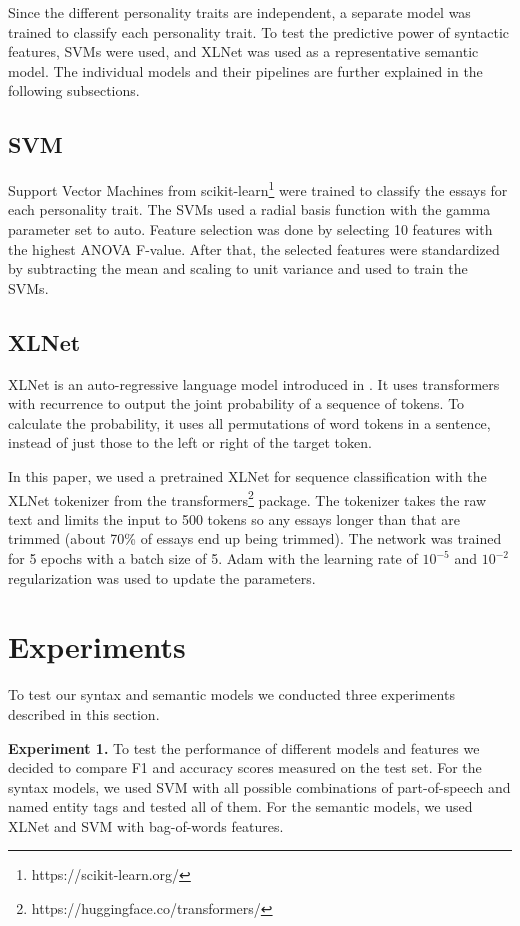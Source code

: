 \documentclass[10pt, a4paper]{article}
\begin{document}
Since the different personality traits are independent, a separate model was trained to classify each personality trait.
To test the predictive power of syntactic features, SVMs were used, and XLNet was used as a representative semantic model.
The individual models and their pipelines are further explained in the following subsections.

\subsection{SVM}

Support Vector Machines from scikit-learn\footnote{https://scikit-learn.org/} were trained to classify the essays for each personality trait.
The SVMs used a radial basis function with the gamma parameter set to auto.
Feature selection was done by selecting 10 features with the highest ANOVA F-value.
After that, the selected features were standardized by subtracting the mean and scaling to unit variance and used to train the SVMs.

\subsection{XLNet}

XLNet is an auto-regressive language model introduced in \citep{DBLP:journals/corr/abs-1906-08237}.
It uses transformers with recurrence to output the joint probability of a sequence of tokens.
To calculate the probability, it uses all permutations of word tokens in a sentence, instead of just those to the left or right of the target token.

In this paper, we used a pretrained XLNet for sequence classification with the XLNet tokenizer from the transformers\footnote{https://huggingface.co/transformers/} package.
The tokenizer takes the raw text and limits the input to 500 tokens so any essays longer than that are trimmed (about 70\% of essays end up being trimmed).
The network was trained for 5 epochs with a batch size of 5.
Adam with the learning rate of $10^{-5}$ and $10^{-2}$ regularization was used to update the parameters.

\section{Experiments}
To test our syntax and semantic models we conducted three experiments described in this section.

\textbf{Experiment 1.} To test the performance of different models and features we decided to compare F1 and accuracy scores measured on the test set.
For the syntax models, we used SVM with all possible combinations of part-of-speech and named entity tags and tested all of them.
For the semantic models, we used XLNet and SVM with bag-of-words features.
\end{document}
